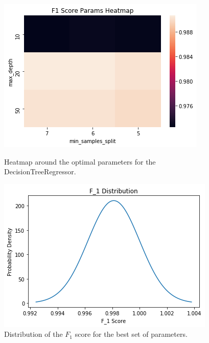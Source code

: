\documentclass[a4paper]{article}
\begin{document}
\begin{figure}[H]
\centering
\begin{minipage}{.45\textwidth}
  \centering
  \includegraphics[width=1\linewidth]{f1_heatmap.png}
  \caption{Heatmap around the optimal parameters for the DecisionTreeRegressor.}
  \label{fig:test1}
\end{minipage}%
\hspace{4mm}
\begin{minipage}{.45\textwidth}
  \centering
  \includegraphics[width=1\linewidth]{f1_dist.png}
  \caption{\scriptsize{Distribution of the $F_1$ score for the best set of parameters.}}
  \label{fig:test2}
\end{minipage}
\end{figure}
\end{document}
